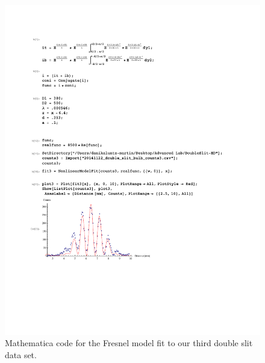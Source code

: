 \documentclass[prb,preprint]{revtex4-1}
\begin{document}
\begin{figure}[h!]
\centering
\includegraphics[width=6in]{DoubleSlitFresnel3.pdf}
\caption{Mathematica code for the Fresnel model fit to our third double slit data set.}
\label{DoubleSlitFresnel3}
\end{figure}
\end{document}
